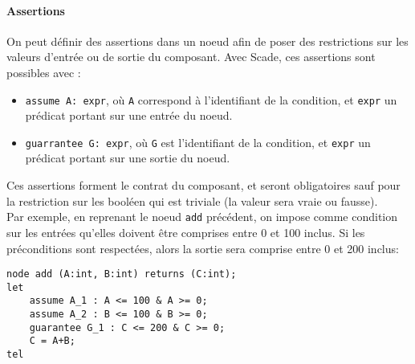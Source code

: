 \paragraph{Assertions}
On peut définir des assertions dans un noeud afin de poser des
restrictions sur les valeurs d'entrée ou de sortie du composant. Avec
Scade, ces assertions sont possibles avec :
\begin{itemize}
\item \texttt{assume A: expr}, où \texttt{A} correspond à l'identifiant de la condition, et
\texttt{expr} un prédicat portant sur une entrée du noeud.
\item \texttt{guarrantee G: expr}, où \texttt{G} est l'identifiant de la condition, et
\texttt{expr} un prédicat portant sur une sortie du noeud.
\end{itemize}
Ces assertions forment le contrat du composant, et seront
obligatoires sauf pour la restriction sur les booléen qui est triviale (la
valeur sera vraie ou fausse).\\
Par exemple, en reprenant le noeud \texttt{add} précédent, on impose comme condition sur
les entrées qu'elles doivent être comprises entre 0 et 100 inclus. Si les
préconditions sont respectées, alors la sortie sera comprise entre 0 et 200 inclus:
\begin{verbatim}
node add (A:int, B:int) returns (C:int);
let 
    assume A_1 : A <= 100 & A >= 0;
    assume A_2 : B <= 100 & B >= 0;
    guarantee G_1 : C <= 200 & C >= 0;
    C = A+B;
tel
\end{verbatim}

